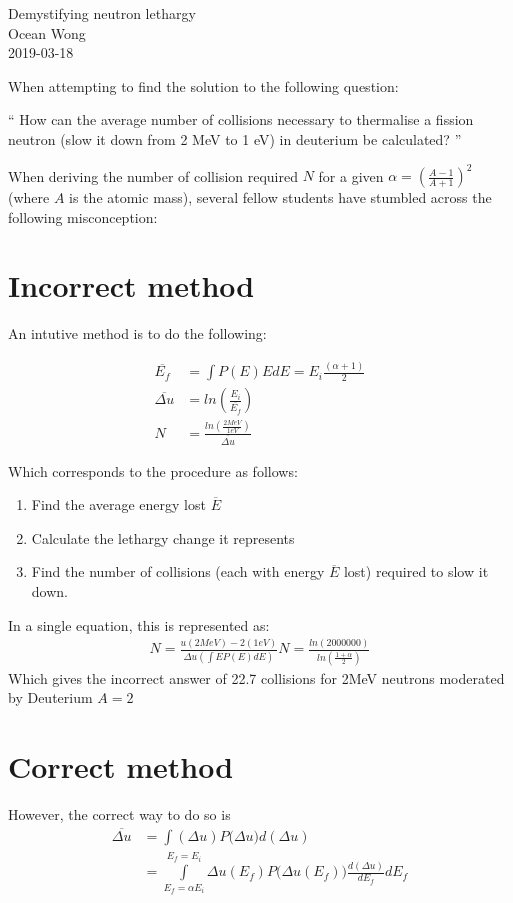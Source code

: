 \documentclass[a4paper, 12pt]{article}
\begin{document}
\begin{center}
Demystifying neutron lethargy			\\
Ocean Wong								\\
2019-03-18
\end{center}

When attempting to find the solution to the following question:

`` 
How can the average number of collisions necessary to thermalise a fission neutron (slow
it down from 2 MeV to 1 eV) in deuterium be calculated?
'' 

When deriving the number of collision required $N$ for a given $\alpha = (\frac{A-1}{A+1})^2$ (where $A$ is the atomic mass), several fellow students have stumbled across the following misconception:

\section{Incorrect method}\label{Incorrect}
An intutive method is to do the following:

\begin{align}
	\overline{E_f} &= \int P(E) E dE =  {E_i} \frac{(\alpha+1)}{2} \\
	\overline{\Delta u} &= ln \left( \frac{E_i}{\overline{E_f}} \right)	\\
	N &= \frac{ ln \left( \frac{2 MeV}{1eV} \right)} { \overline{\Delta u} }
\end{align}

Which corresponds to the procedure as follows:
\begin{enumerate}
	\item Find the average energy lost $\overline{E}$
	\item Calculate the lethargy change it represents
	\item Find the number of collisions (each with energy $\overline{E}$ lost) required to slow it down.
\end{enumerate}

In a single equation, this is represented as:
\begin{align}
	N=\frac{u(2MeV) - 2(1eV)}{\Delta u \left(\int E P(E) dE \right) }
	N=\frac{ln\left(2000000\right)}{ln\left(\frac{1+\alpha}{2} \right)}
\end{align}
Which gives the incorrect answer of 22.7 collisions for 2MeV neutrons moderated by Deuterium $A=2$

\section{Correct method} \label{Correct}
	However, the correct way to do so is 
\begin{align}
	\overline{\Delta u} &= \int (\Delta u) P\big(\Delta u \big) d(\Delta u)	\\
		&= \int\limits_{E_f=\alpha E_i}^{E_f=E_i} \Delta u (E_f) P\big(\Delta u (E_f) \big) \frac{d(\Delta u)}{dE_f} dE_f \label{scaleUprob}
\end{align}
\end{document}
